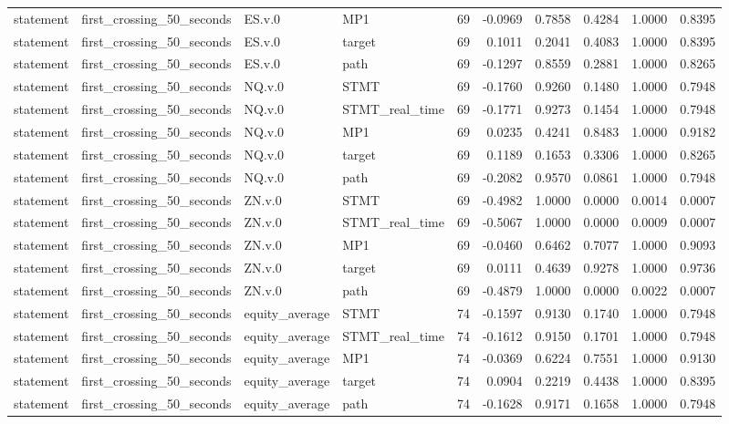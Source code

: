 \begin{tabular}{llllrrrrrr}
statement & first_crossing_50_seconds & ES.v.0 & MP1 & 69 & -0.0969 & 0.7858 & 0.4284 & 1.0000 & 0.8395 \\
statement & first_crossing_50_seconds & ES.v.0 & target & 69 & 0.1011 & 0.2041 & 0.4083 & 1.0000 & 0.8395 \\
statement & first_crossing_50_seconds & ES.v.0 & path & 69 & -0.1297 & 0.8559 & 0.2881 & 1.0000 & 0.8265 \\
statement & first_crossing_50_seconds & NQ.v.0 & STMT & 69 & -0.1760 & 0.9260 & 0.1480 & 1.0000 & 0.7948 \\
statement & first_crossing_50_seconds & NQ.v.0 & STMT_real_time & 69 & -0.1771 & 0.9273 & 0.1454 & 1.0000 & 0.7948 \\
statement & first_crossing_50_seconds & NQ.v.0 & MP1 & 69 & 0.0235 & 0.4241 & 0.8483 & 1.0000 & 0.9182 \\
statement & first_crossing_50_seconds & NQ.v.0 & target & 69 & 0.1189 & 0.1653 & 0.3306 & 1.0000 & 0.8265 \\
statement & first_crossing_50_seconds & NQ.v.0 & path & 69 & -0.2082 & 0.9570 & 0.0861 & 1.0000 & 0.7948 \\
statement & first_crossing_50_seconds & ZN.v.0 & STMT & 69 & -0.4982 & 1.0000 & 0.0000 & 0.0014 & 0.0007 \\
statement & first_crossing_50_seconds & ZN.v.0 & STMT_real_time & 69 & -0.5067 & 1.0000 & 0.0000 & 0.0009 & 0.0007 \\
statement & first_crossing_50_seconds & ZN.v.0 & MP1 & 69 & -0.0460 & 0.6462 & 0.7077 & 1.0000 & 0.9093 \\
statement & first_crossing_50_seconds & ZN.v.0 & target & 69 & 0.0111 & 0.4639 & 0.9278 & 1.0000 & 0.9736 \\
statement & first_crossing_50_seconds & ZN.v.0 & path & 69 & -0.4879 & 1.0000 & 0.0000 & 0.0022 & 0.0007 \\
statement & first_crossing_50_seconds & equity_average & STMT & 74 & -0.1597 & 0.9130 & 0.1740 & 1.0000 & 0.7948 \\
statement & first_crossing_50_seconds & equity_average & STMT_real_time & 74 & -0.1612 & 0.9150 & 0.1701 & 1.0000 & 0.7948 \\
statement & first_crossing_50_seconds & equity_average & MP1 & 74 & -0.0369 & 0.6224 & 0.7551 & 1.0000 & 0.9130 \\
statement & first_crossing_50_seconds & equity_average & target & 74 & 0.0904 & 0.2219 & 0.4438 & 1.0000 & 0.8395 \\
statement & first_crossing_50_seconds & equity_average & path & 74 & -0.1628 & 0.9171 & 0.1658 & 1.0000 & 0.7948 \\

\end{tabular}
